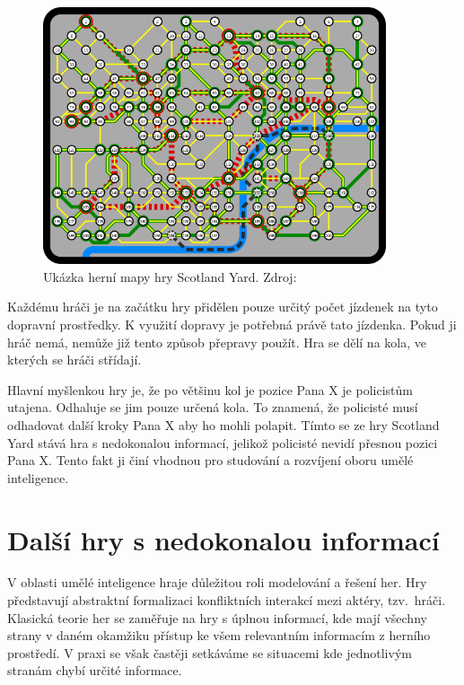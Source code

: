 \begin{figure}[!h]
	\centering
	\includegraphics[width=0.9\textwidth]{obrazky-figures/scotland_original}
	\caption{Ukázka herní mapy hry Scotland Yard.
  Zdroj:\cite{scotland_original_image}}\label{fig:figure}
\end{figure}

Každému hráči je na začátku hry přidělen pouze určitý počet jízdenek na tyto dopravní prostředky.
K využití dopravy je potřebná právě tato jízdenka.
Pokud ji hráč nemá, nemůže již tento způsob přepravy použít.
Hra se dělí na kola, ve kterých se hráči střídají.

Hlavní myšlenkou hry je, že po většinu kol je pozice Pana X je policistům utajena.
Odhaluje se jim pouze určená kola.
To znamená, že policisté musí odhadovat další kroky Pana X aby ho mohli polapit.
Tímto se ze hry Scotland Yard stává hra s nedokonalou informací, jelikož policisté nevidí přesnou pozici Pana X\@.
Tento fakt ji činí vhodnou pro studování a rozvíjení oboru umělé inteligence.



\section{Další hry s nedokonalou informací}\label{sec:dalsi-hry-s-nedokonalou-informaci}
V oblasti umělé inteligence hraje důležitou roli modelování a řešení her.
Hry představují abstraktní formalizaci konfliktních interakcí mezi aktéry, tzv.~hráči.
Klasická teorie her se zaměřuje na hry s úplnou informací, kde mají všechny strany v daném okamžiku přístup ke všem relevantním informacím z herního prostředí.
V praxi se však častěji setkáváme se situacemi kde jednotlivým stranám chybí určité informace.


